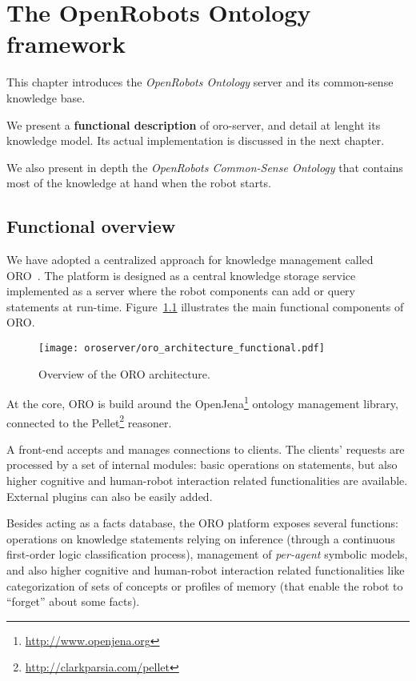 \chapter{The OpenRobots Ontology framework}
\label{chapt|oroserver}

This chapter introduces the \emph{OpenRobots Ontology} server and its
common-sense knowledge base.

We present a \textbf{functional description} of oro-server, and detail at
lenght its knowledge model. Its actual implementation is discussed in the next
chapter.

We also present in depth the \emph{OpenRobots Common-Sense Ontology} that
contains most of the knowledge at hand when the robot starts.

\section{Functional overview}
\label{sect|functional-overview}


We have adopted a centralized approach for knowledge management called
ORO~\cite{Lemaignan2010}. The platform is designed as a central
knowledge storage service implemented as a server where the robot
components can add or query statements at run-time. Figure~\ref{fig|oro-overview}
illustrates the main functional components of ORO.

\begin{figure}
\centering
  \texttt{[image: oroserver/oro\_architecture\_functional.pdf]}
  \caption{Overview of the ORO architecture.}
  \label{fig|oro-overview}
\end{figure}

At the core, ORO is build around the
OpenJena\footnote{\url{http://www.openjena.org}} ontology management library,
connected to the Pellet\footnote{\url{http://clarkparsia.com/pellet}}
reasoner.

A front-end accepts and manages connections to clients. The clients' requests
are processed by a set of internal modules: basic operations on statements,
but also higher cognitive and human-robot interaction related functionalities
are available. External plugins can also be easily added.

Besides acting as a facts database, the ORO platform exposes several
functions: operations on knowledge statements relying on inference (through a
continuous first-order logic classification process), management of
\emph{per-agent} symbolic models, and also higher cognitive and human-robot
interaction related functionalities like categorization of sets of concepts
or profiles of memory (that enable the robot to ``forget'' about some facts).

